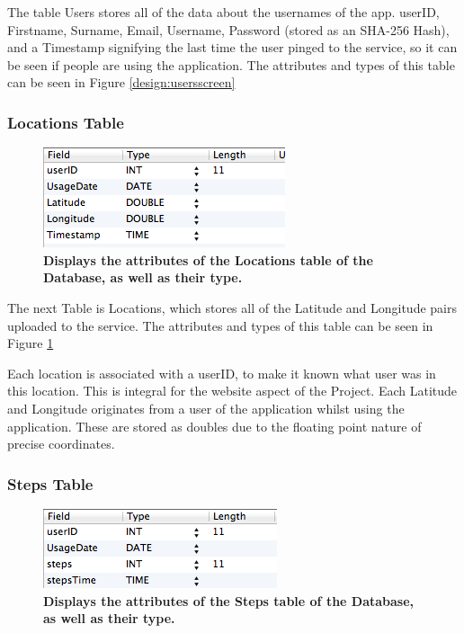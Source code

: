 \documentclass{l4proj}
\begin{document}
The table Users stores all of the data about the usernames of the app. userID, Firstname, Surname, Email, Username, Password (stored as an SHA-256 Hash), and a Timestamp signifying the last time the user pinged to the service, so it can be seen if people are using the application. The attributes and types of this table can be seen in Figure \ref{design:usersscreen}

\subsubsection{Locations Table}

\begin{figure}[ht!]
\centering
\includegraphics[scale=1.0]{images/screenshots/locationsscreen.png}
\caption{\textbf{Displays the attributes of the Locations table of the Database, as well as their type.}}
\label{design:locationsscreen}
\end{figure}

The next Table is Locations, which stores all of the Latitude and Longitude pairs uploaded to the service. The attributes and types of this table can be seen in Figure \ref{design:locationsscreen}

Each location is associated with a userID, to make it known what user was in this location. This is integral for the website aspect of the Project. Each Latitude and Longitude originates from a user of the application whilst using the application. These are stored as doubles due to the floating point nature of precise coordinates.

\subsubsection{Steps Table}

\begin{figure}[ht!]
\centering
\includegraphics[scale=1.0]{images/screenshots/stepsscreen.png}
\caption{\textbf{Displays the attributes of the Steps table of the Database, as well as their type.}}
\label{design:stepsscreen}
\end{figure}
\end{document}
